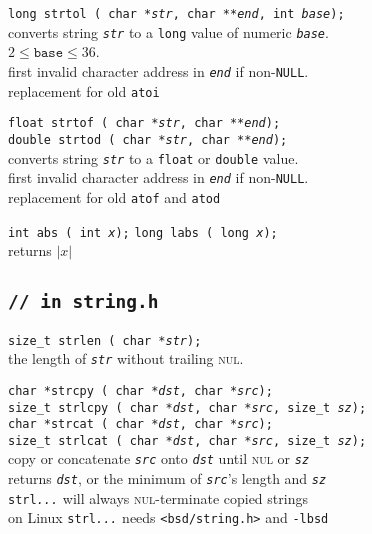 \documentclass[8pt]{article}
\newcommand{\Cc}[1]{\texttt{#1}}
\newcommand{\cmt}[1]{\textcolor[gray]{.3}{\texttt{#1}}} %
\newcommand{\ty}[1]{\textcolor{blue!80}{\texttt{#1}}} %
\newcommand{\kv}[1]{\textcolor{red!40!black}{\texttt{#1}}} %
\newcommand{\fn}[1]{\texttt{#1}} %
\newcommand{\var}[1]{\texttt{\textit{#1}}} %
\newcommand{\opt}[1]{\textrm{\textit{#1}}} %
\newcommand{\htab}{\hspace*{2em}} %
\begin{document}
\begin{multicols}{3}
\Cc{\ty{long} \fn{strtol}\,(%
    \ty{char *}\var{str}, %
    \ty{char **}\var{end}, %
    \ty{int} \var{base});}\\
\htab converts string \var{str} to a \ty{long} value of numeric \var{base}. \\
\htab $2\le\texttt{base}\le36$. \\
\htab first invalid character address in \var{end} if non-\kv{NULL}. \\
\htab replacement for old \fn{atoi}

\Cc{\ty{float} \fn{strtof}\,(%
    \ty{char *}\var{str}, %
    \ty{char **}\var{end});}\\
\Cc{\ty{double} \fn{strtod}\,(%
    \ty{char *}\var{str}, %
    \ty{char **}\var{end});}\\
\htab converts string \var{str} to a \ty{float} or \ty{double} value. \\
\htab first invalid character address in \var{end} if non-\kv{NULL}. \\
\htab replacement for old \fn{atof} and \fn{atod}

\Cc{\ty{int} \fn{abs}\,(%
    \ty{int} \var{x});} \hfill
\Cc{\ty{long} \fn{labs}\,(%
    \ty{long} \var{x});} \\
\htab returns $\left|x\right|$


\subsection*{\Cc{\cmt{// in string.h}}}

\Cc{\ty{size\_t} \fn{strlen}\,(%
    \ty{char *}\var{str});} \\
\htab the length of \var{str} without trailing \textsc{nul}.

\Cc{\ty{char *}\fn{strcpy}\,(%
    \ty{char *}\var{dst}, %
    \ty{char *}\var{src});} \\
\Cc{\ty{size\_t} \fn{strlcpy}\,(%
    \ty{char *}\var{dst}, %
    \ty{char *}\var{src}, %
    \ty{size\_t} \var{sz});} \\
\Cc{\ty{char *}\fn{strcat}\,(%
    \ty{char *}\var{dst}, %
    \ty{char *}\var{src});} \\
\Cc{\ty{size\_t} \fn{strlcat}\,(%
    \ty{char *}\var{dst}, %
    \ty{char *}\var{src}, %
    \ty{size\_t} \var{sz});} \\
\htab copy or concatenate \var{src} onto \var{dst} until \textsc{nul} or \var{sz} \\
\htab returns \var{dst}, or the minimum of \var{src}'s length and \var{sz} \\
\htab \fn{strl\opt{...}} will always \textsc{nul}-terminate copied strings \\
\htab on Linux \fn{strl\opt{...}} needs \Cc{<bsd/string.h>} and \texttt{-lbsd}


\end{multicols}
\end{document}

